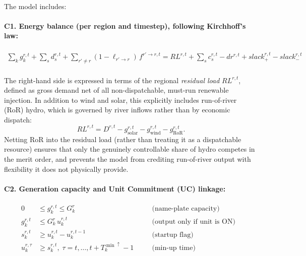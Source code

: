 \documentclass[12pt]{article}
\begin{document}
\paragraph{}
The model includes:

\paragraph{C1. Energy balance (per region and timestep), following Kirchhoff's law:}
\begin{equation}\label{eq:C1}
\begin{split}
\sum_k g^{r,t}_k
  + \sum_s d^{r,t}_s
  + \sum_{r'\neq r} (1-\ell_{r'\to r})\, f^{r'\to r,t}
= RL^{r,t}
  + \sum_s c^{r,t}_s
  - dr^{r,t}
  + slack^{r,t}_{+}
  - slack^{r,t}_{-}
\end{split}
\end{equation}
\paragraph{}
The right-hand side is expressed in terms of the regional \emph{residual load} $RL^{r,t}$, defined as gross demand net of all non-dispatchable, must-run renewable injection. In addition to wind and solar, this explicitly includes run-of-river (RoR) hydro, which is governed by river inflows rather than by economic dispatch:
\begin{equation}\label{eq:residual_load}
RL^{r,t} = D^{r,t} - g^{r,t}_{\text{solar}} - g^{r,t}_{\text{wind}} - g^{r,t}_{\text{RoR}} .
\end{equation}
Netting RoR into the residual load (rather than treating it as a dispatchable resource) ensures that only the genuinely controllable share of hydro competes in the merit order, and prevents the model from crediting run-of-river output with flexibility it does not physically provide.

\paragraph{C2. Generation capacity and Unit Commitment (UC) linkage:}
\begin{subequations}\label{eq:C2}
\begin{alignat}{4}
0 &\le g^{r,t}_k \le G^{r}_k
   &\quad&\text{(name‑plate capacity)}  &\tag{3a}\label{eq:C2a}\\[4pt]
g^{r,t}_k &\le G^{r}_k\,u^{r,t}_k
         &\quad&\text{(output only if unit is ON)} &\tag{3b}\label{eq:C2b}\\[4pt]
s^{r,t}_k &\ge u^{r,t}_k - u^{r,t-1}_k
         &\quad&\text{(startup flag)}             &\tag{3c}\label{eq:C2c}\\[4pt]
u^{r,\tau}_k &\ge s^{r,t}_k,\;
   \tau=t,\dots,t+T^{\min\uparrow}_k-1
         &\quad&\text{(min‑up time)}              &\tag{3d}\label{eq:C2d}
\end{alignat}
\end{subequations}
\end{document}
